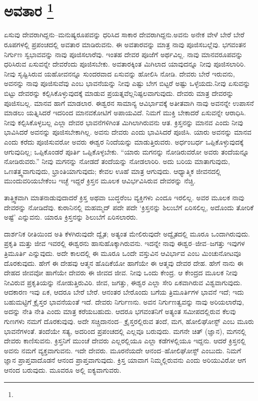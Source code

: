 
\chapter[ಅವತಾರ ]{ಅವತಾರ \protect\footnote{}}

ಏಸುವು ದೇವರಾಗಿದ್ದನು–ಮನುಷ್ಯರೂಪವನ್ನು ಧರಿಸಿದ ಸಾಕಾರ ದೇವರಾಗಿದ್ದನು.\break ಅವನು ಅನೇಕ ವೇಳೆ ಬೇರೆ ಬೇರೆ ರೂಪಗಳಲ್ಲಿ ಪ್ರಪಂಚದಲ್ಲಿ ಅವತಾರ ಮಾಡಿರುವನು. ಈ ಅವತಾರವನ್ನು ಮಾತ್ರ ನಾವು ಪೂಜಿಸಬಲ್ಲೆವು. ಭಗವಂತನ ನಿರ್ಗುಣ ಸ್ವಭಾವವನ್ನು ನಾವು ಪೂಜಿಸಲಾರೆವು. ಇಂತಹ ದೇವರ ಪೂಜೆಗೆ ಅರ್ಥವಿಲ್ಲ. ನಾವು ಮಾನವರೂಪವನ್ನು ಧರಿಸಿರುವ ಏಸುವನ್ನೇ ದೇವರೆಂದು ಪೂಜಿಸಬೇಕು. ಅವತಾರಕ್ಕಿಂತ ಮಿಗಿಲಾದ ಯಾವುದನ್ನೂ ನೀವು ಪೂಜಿಸಲಾರಿರಿ. ನೀವು ಸೃಷ್ಟಿಸಿರುವ ಯಹೋವನನ್ನೂ ಸುಂದರವಾದ ಏಸುವನ್ನು ಹೋಲಿಸಿ ನೋಡಿ. ದೇವರು ಬೇರೆ ಇರುವನು, ಅವನನ್ನು ನಾವು ಪೂಜಿಸುವೆವು ಎಂಬ ಭಾವನೆಯನ್ನು ನೀವು ಎಷ್ಟು ಬೇಗ ಬಿಟ್ಟರೆ ಅಷ್ಟು ಒಳ್ಳೆಯದು.\break ನೀವು ಏಸುವನ್ನು ಬಿಟ್ಟು ದೇವರನ್ನು ಕಲ್ಪಿಸಿಕೊಳ್ಳುವುದಕ್ಕೆ ಮಾಡುವ ಪ್ರಯತ್ನವೆಲ್ಲ\break ನಿಷ್ಫಲವಾಗುವುದು. ದೇವರು ಮಾತ್ರ ದೇವರನ್ನು ಪೂಜಿಸಬಲ್ಲ. ಮಾನವ ಹಾಗೆ ಮಾಡಲಾರ. ಈಶ್ವರನ ಸಾಮಾನ್ಯ ಆವಿರ್ಭಾವಕ್ಕೆ ಅತೀತವಾಗಿ ನಾವು ಅವನನ್ನೇ ಉಪಾಸನೆ ಮಾಡಲು ಯತ್ನಿಸಿದರೆ ಇದರಿಂದ ಮಾನವಕೋಟಿಗೆ ಅಪಾಯವಿದೆ. ನಿಮಗೆ ಮುಕ್ತಿ ಬೇಕಾದರೆ ಏಸುವನ್ನೇ ಆರಾಧಿಸಿ. ನೀವು ಕಲ್ಪಿಸಿಕೊಳ್ಳಬಲ್ಲ ಎಲ್ಲಾ ದೇವರ ಭಾವನೆಗಳಿಗಿಂತ ಮಿಗಿಲಾಗಿರುವನು ಆತ. ಕ್ರಿಸ್ತನನ್ನು ಮಾನವ ಎಂದು ನೀವು ಭಾವಿಸಿದರೆ ಅವನನ್ನು ಪೂಜಿಸಬೇಕಾಗಿಲ್ಲ. ಅವನು ದೇವರು ಎಂದು ಭಾವಿಸಿದರೆ ಪೂಜಿಸಿ. ಯಾರು ಅವನನ್ನು ಮಾನವ ಎಂದು ಕರೆದು ಪೂಜಿಸುವರೋ ಅವರು ಈಶ್ವರ ನಿಂದೆಯನ್ನು ಮಾಡುತ್ತಿರುವರು. ಅರ್ಧಂಬರ್ಧ ಒಪ್ಪಿಕೊಳ್ಳುವುದಕ್ಕೆ ಆಗುವುದಿಲ್ಲ; ಒಪ್ಪಿಕೊಂಡರೆ ಪೂರ್ತಿ ಒಪ್ಪಿಕೊಳ್ಳಬೇಕು. “ಯಾರು ಮಗನನ್ನು ನೋಡಿರುವರೋ ಅವರು ತಂದೆಯನ್ನೂ ನೋಡಿರುವರು.” ನೀವು ಮಗನನ್ನು ನೋಡದೆ ತಂದೆಯನ್ನು ನೋಡಲಾರಿರಿ. ಅದು ಬರಿಯ ಮಾತಾಗುವುದು, ಒಣತತ್ತ್ವವಾಗುವುದು, ಭ್ರಾಂತಿಯಾಗುವುದು; ಕೇವಲ ಊಹೆ ಮಾತ್ರ ಆಗುವುದು. ಆಧ್ಯಾತ್ಮಿಕ ಜೀವನದಲ್ಲಿ ಮುಂದುವರಿಯಬೇಕೆಂಬ ಇಚ್ಛೆ ಇದ್ದರೆ ಕ್ರಿಸ್ತನ ಮೂಲಕ ಆವಿರ್ಭವಿಸಿರುವ ದೇವರನ್ನು ನೆಚ್ಚಿ.

ತಾತ್ತ್ವಿಕವಾಗಿ ಮಾತನಾಡುವುದಾದರೆ ಕ್ರಿಸ್ತ ಅಥವಾ ಬುದ್ಧರೆಂಬ ವ್ಯಕ್ತಿಗಳು ಎಂದೂ ಇರಲಿಲ್ಲ. ಅವರ ಮೂಲಕ ನಾವು ದೇವರನ್ನು ನೋಡಿದೆವು. ಕುರಾನಿನಲ್ಲಿ ಮಹಮ್ಮದ್​ ಪದೇ ಪದೇ ‘ಕ್ರಿಸ್ತನನ್ನು ಶಿಲುಬೆಗೆ ಏರಿಸಲಿಲ್ಲ, ಅದೊಂದು ತೋರಿಕೆ ಅಷ್ಟೆ’ ಎನ್ನುವನು. ಯಾರೂ ಕ್ರಿಸ್ತನನ್ನು ಶಿಲುಬೆಗೆ ಏರಿಸಲಾರರು.

\eject

ದಾರ್ಶನಿಕ ರೀತಿಯಿಂದ ಅತಿ ಕೆಳಗಿರುವುದೇ ದ್ವೈತ; ಅತ್ಯಂತ ಮೇಲಿರುವುದೇ ಅದ್ವೈತದಲ್ಲಿ ಮೂರೂ ಒಂದಾಗಿರುವುದು. ಪ್ರಕೃತಿ ಮತ್ತು ಜೀವ ಇವರಲ್ಲಿ ಈಶ್ವರನು ಹಾಸುಹೊಕ್ಕಾಗಿರುವನು. ಇದನ್ನೇ ನಾವು ಈಶ್ವರ–ಜೀವ–ಜಗತ್ತು ಇವುಗಳ ತ್ರಿಮೂರ್ತಿ ಎನ್ನುವುದು. ಅದೇ ಕಾಲದಲ್ಲಿ ಈ ಮೂರೂ ಒಂದೇ ವಸ್ತುವಿನ ಆವಿರ್ಭಾವ ಎಂಬ ಮಿಂಚುನೋಟವೂ ದೊರಕುವುದು. ಹೇಗೆ ಈ ದೇಹವು ಆತ್ಮನ ಹೊದಿಕೆಯೋ ಹಾಗೆಯೇ ಈ ಆತ್ಮವು ದೇವರ ದೇಹ. ಹೇಗೆ ನಾನು ಈ ದೇಹದ ಜೀವವೋ ಹಾಗೆಯೇ ದೇವರು ಈ ಜೀವದ ಜೀವ. ನೀವು ಒಂದು ಕೇಂದ್ರ. ಆ ಕೇಂದ್ರದ ಮೂಲಕ ನೀವು ನೀವಿರುವ ಪ್ರಕೃತಿಯನ್ನು ನೋಡುತ್ತಿರುವಿರಿ. ಜೀವ, ಜಗತ್ತು, ಈಶ್ವರ ಎಲ್ಲಾ ಸೇರಿ ಏಕವಾಗಿರುವ ವಿಶ್ವವಾಗುವುದು. ಆದಕಾರಣ ಇವು ಏಕ, ಆದರೂ ಬೇರೆ ಬೇರೆ. ಆನಂತರ ಬೇರೊಂದು ಬಗೆಯ ತ್ರಿಮೂರ್ತಿಗಳ ಭಾವನೆ ಇದೆ; ಇದು ಬಹುಮಟ್ಟಿಗೆ ಕ್ರೈಸ್ತರ ಭಾವನೆಯಂತೆ ಇದೆ. ದೇವರು ನಿರ್ಗುಣನು. ಅವನ ನಿರ್ಗುಣತ್ವವನ್ನು ನಾವು ಅರಿಯಲಾರೆವು, ಅದನ್ನು ನೇತಿ ನೇತಿ ಎಂದು ಮಾತ್ರ ಕರೆಯಬಹುದು. ಆದರೂ ಭಗವಂತನಿಗೆ ಅತ್ಯಂತ ಸಮೀಪದಲ್ಲಿರುವ ಕೆಲವು ಗುಣಗಳು ನಮಗೆ ದೊರಕುವುವು. ಅದೇ ಸಚ್ಚಿದಾನಂದ– ಕ್ರೈಸ್ತರಲ್ಲಿರುವ ತಂದೆ, ಮಗ, ಹೋಲಿಘೋಸ್ಟ್​ ಎಂಬ ಮೂರು ಭಾವನೆಗಳಂತೆ. ತಂದೆಯೇ ಸತ್ಯ, ಅದರಿಂದ ಪ್ರಪಂಚದಲ್ಲಿ ಎಲ್ಲವೂ ಬರುವುದು. ಮಗನೇ ಚಿತ್​ (ಜ್ಞಾನ), ಮಗನಲ್ಲಿ ದೇವರು ಕಾಣಿಸುವನು. ಕ್ರಿಸ್ತನಿಗೆ ಮುಂಚೆ ದೇವರು ಎಲ್ಲರಲ್ಲಿಯೂ ಎಲ್ಲಾ ಕಡೆಗಳಲ್ಲಿಯೂ ಇದ್ದನು. ಆದರೆ ಕ್ರಿಸ್ತನಲ್ಲಿ ಅವನು ನಮಗೆ ವ್ಯಕ್ತವಾಗುವನು. ಇದೇ ದೇವರು. ಮೂರನೆಯದೇ ಆನಂದ–ಹೋಲಿಘೋಸ್ಟ್​ ಎಂಬುದು. ನಿಮಗೆ ಜ್ಞಾನ ಪ್ರಾಪ್ತವಾದೊಡನೆ ಆನಂದ ಪ್ರಾಪ್ತವಾಗುವುದು. ಕ್ರಿಸ್ತ ಯಾವಾಗ ನಿಮ್ಮಲ್ಲಿರುವನು ಎಂದು ಅರಿಯುವಿರೋ ಆಗ ಆನಂದ ಬರುವುದು. ಮೂವರೂ ಅಲ್ಲಿ ಐಕ್ಯವಾಗುವರು.

\vskip -0.5cm

